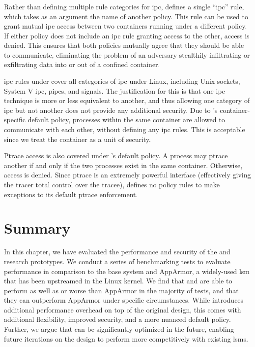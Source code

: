 \subsubsection{\bpfcontain{}}

Rather than defining multiple rule categories for \gls{ipc}, \bpfcontain{} defines
a single \enquote{\gls{ipc}} rule, which takes as an argument the name of another
\bpfcontain{} policy. This rule can be used to grant mutual \gls{ipc} access between two
containers running under a different policy. If either policy does not include an
\gls{ipc} rule granting access to the other, access is denied. This ensures that both
policies mutually agree that they should be able to communicate, eliminating the problem
of an adversary stealthily infiltrating or exfiltrating data into or out of a confined
container.

\gls{ipc} rules under \bpfcontain{} cover all categories of \gls{ipc} under Linux,
including Unix sockets, System V \gls{ipc}, pipes, and signals. The justification for this
is that one \gls{ipc} technique is more or less equivalent to another, and thus allowing
one category of \gls{ipc} but not another does not provide any additional security. Due to
\bpfcontain{}'s container-specific default policy, processes within the same container are
allowed to communicate with each other, without defining any \gls{ipc} rules. This is
acceptable since we treat the container as a unit of security.

Ptrace access is also covered under \bpfcontain{}'s default policy. A process may ptrace
another if and only if the two processes exist in the same container. Otherwise, access is
denied. Since ptrace is an extremely powerful interface (effectively giving the tracer
total control over the tracee), \bpfcontain{} defines no policy rules to make exceptions
to its default ptrace enforcement.


\section{Summary}%
\label{s:eval-summary}

In this chapter, we have evaluated the performance and security of the \bpfbox{} and
\bpfcontain{} research prototypes. We conduct a series of benchmarking tests to evaluate
performance in comparison to the base system and AppArmor, a widely-used \gls{lsm} that
has been upstreamed in the Linux kernel. We find that \bpfbox{} and \bpfcontain{} are able
to perform as well as or worse than AppArmor in the majority of tests, and that they can
outperform AppArmor under specific circumstances. While \bpfcontain{} introduces
additional performance overhead on top of the original \bpfbox{} design, this comes with
additional flexibility, improved security, and a more nuanced default policy. Further, we
argue that \bpfcontain{} can be significantly optimized in the future, enabling future
iterations on the design to perform more competitively with existing \glspl{lsm}.

